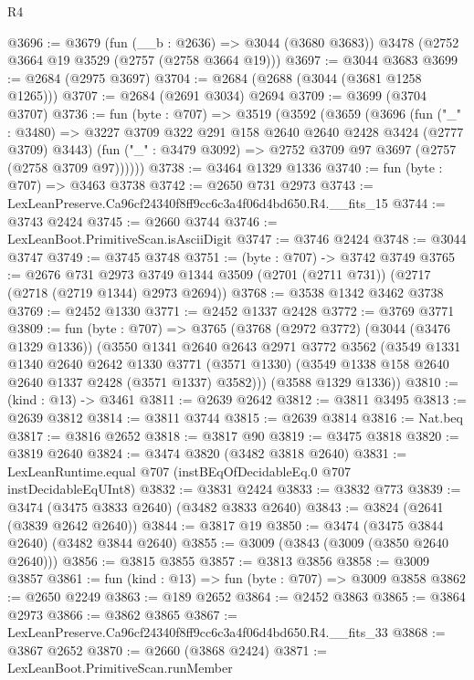 \begin{lexlean}{R4}
\begin{coremodule}
@3696 := @3679
    (fun (__b : @2636) => @3044 (@3680 @3683))
    @3478
    (@2752 @3664 @19 @3529 (@2757 (@2758 @3664 @19)))
@3697 := @3044 @3683
@3699 := @2684 (@2975 @3697)
@3704 := @2684 (@2688 (@3044 (@3681 @1258 @1265)))
@3707 := @2684 (@2691 @3034) @2694
@3709 := @3699 (@3704 @3707)
@3736 := fun (byte : @707) =>
  @3519
    (@3592
      (@3659
        (@3696
          (fun ("_" : @3480) =>
          @3227 @3709 @322 @291 @158 @2640 @2640 @2428 @3424 (@2777 @3709) @3443)
          (fun ("_" : @3479 @3092) => @2752 @3709 @97 @3697 (@2757 (@2758 @3709 @97))))))
@3738 := @3464 @1329 @1336
@3740 := fun (byte : @707) => @3463 @3738
@3742 := @2650 @731 @2973
@3743 := LexLeanPreserve.Ca96cf24340f8ff9cc6c3a4f06d4bd650.R4.__fits_15
@3744 := @3743 @2424
@3745 := @2660 @3744
@3746 := LexLeanBoot.PrimitiveScan.isAsciiDigit
@3747 := @3746 @2424
@3748 := @3044 @3747
@3749 := @3745 @3748
@3751 := (byte : @707) -> @3742 @3749
@3765 := @2676
    @731
    @2973
    @3749
    @1344
    @3509
    (@2701 (@2711 @731))
    (@2717 (@2718 (@2719 @1344) @2973 @2694))
@3768 := @3538 @1342 @3462 @3738
@3769 := @2452 @1330
@3771 := @2452 @1337 @2428
@3772 := @3769 @3771
@3809 := fun (byte : @707) =>
  @3765
    (@3768
      (@2972 @3772)
      (@3044 (@3476 @1329 @1336))
      (@3550
        @1341
        @2640
        @2643
        @2971
        @3772
        @3562
        (@3549
          @1331
          @1340
          @2640
          @2642
          @1330
          @3771
          (@3571 @1330)
          (@3549 @1338 @158 @2640 @2640 @1337 @2428 (@3571 @1337) @3582)))
      (@3588 @1329 @1336))
@3810 := (kind : @13) -> @3461
@3811 := @2639 @2642
@3812 := @3811 @3495
@3813 := @2639 @3812
@3814 := @3811 @3744
@3815 := @2639 @3814
@3816 := Nat.beq
@3817 := @3816 @2652
@3818 := @3817 @90
@3819 := @3475 @3818
@3820 := @3819 @2640
@3824 := @3474 @3820 (@3482 @3818 @2640)
@3831 := LexLeanRuntime.equal @707 (instBEqOfDecidableEq.{0} @707 instDecidableEqUInt8)
@3832 := @3831 @2424
@3833 := @3832 @773
@3839 := @3474 (@3475 @3833 @2640) (@3482 @3833 @2640)
@3843 := @3824 (@2641 (@3839 @2642 @2640))
@3844 := @3817 @19
@3850 := @3474 (@3475 @3844 @2640) (@3482 @3844 @2640)
@3855 := @3009 (@3843 (@3009 (@3850 @2640 @2640)))
@3856 := @3815 @3855
@3857 := @3813 @3856
@3858 := @3009 @3857
@3861 := fun (kind : @13) => fun (byte : @707) => @3009 @3858
@3862 := @2650 @2249
@3863 := @189 @2652
@3864 := @2452 @3863
@3865 := @3864 @2973
@3866 := @3862 @3865
@3867 := LexLeanPreserve.Ca96cf24340f8ff9cc6c3a4f06d4bd650.R4.__fits_33
@3868 := @3867 @2652
@3870 := @2660 (@3868 @2424)
@3871 := LexLeanBoot.PrimitiveScan.runMember

\end{coremodule}
\end{lexlean}
